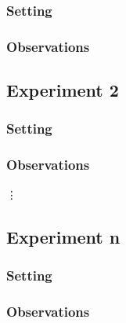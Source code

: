 \documentclass[11pt]{article}
\begin{document}
\subsubsection{Setting}

\subsubsection{Observations}

\subsection{Experiment 2}

\subsubsection{Setting}

\subsubsection{Observations}

\vdots

\subsection{Experiment n}

\subsubsection{Setting}

\subsubsection{Observations}
\end{document}
